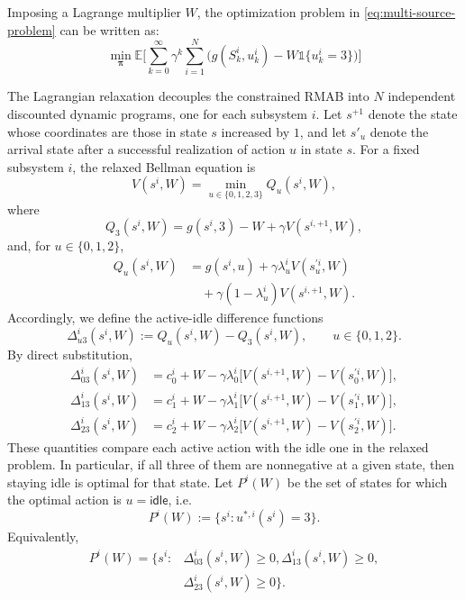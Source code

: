 \documentclass[letterpaper,journal]{IEEEtran}
\begin{document}
Imposing a Lagrange multiplier $W$, the optimization problem in \eqref{eq:multi-source-problem} can be written as:
\begin{equation}\label{eq:relaxed-problem}
\min_{\boldsymbol{\pi}}\mathbb{E}\Biggl[
\sum_{k=0}^{\infty}\gamma^k\sum_{i=1}^N
\bigl(g(S^i_k,u^i_k)-W\mathds{1}\{u^i_k=3\}\bigr)
\Biggr]
\end{equation}

The Lagrangian relaxation decouples the constrained RMAB into $N$ independent discounted dynamic programs, one for each subsystem $i$. Let $s^{+1}$ denote the state whose coordinates are those in state $s$ increased by $1$, and let $s'_u$ denote the arrival state after a successful realization of action $u$ in state $s$. For a fixed subsystem $i$, the relaxed Bellman equation is
\[
V(s^i,W)=\min_{u\in\{0,1,2,3\}}Q_u(s^i,W),
\]
where
\[
Q_3(s^i,W)=g(s^i,3)-W+\gamma V(s^{i,+1},W),
\]
and, for $u\in\{0,1,2\}$,
\[
\begin{aligned}
Q_u(s^i,W)&=g(s^i,u)+\gamma\lambda^i_uV(s^{\prime i}_u,W)\\
&\quad+\gamma(1-\lambda^i_u)V(s^{i,+1},W).
\end{aligned}
\]
Accordingly, we define the active-idle difference functions
\begin{equation}
\Delta^i_{u3}(s^i,W):=Q_u(s^i,W)-Q_3(s^i,W),\qquad u\in\{0,1,2\}.
\end{equation}
By direct substitution,
\begin{subequations}\label{eq:deltas-relaxed}
\begin{align}
\Delta^i_{03}(s^i,W)&=c^i_0+W-\gamma\lambda^i_0\bigl[V(s^{i,+1},W)-V(s^{\prime i}_0,W)\bigr],\\
\Delta^i_{13}(s^i,W)&=c^i_1+W-\gamma\lambda^i_1\bigl[V(s^{i,+1},W)-V(s^{\prime i}_1,W)\bigr],\\
\Delta^i_{23}(s^i,W)&=c^i_2+W-\gamma\lambda^i_2\bigl[V(s^{i,+1},W)-V(s^{\prime i}_2,W)\bigr].
\end{align}
\end{subequations}
These quantities compare each active action with the idle one in the relaxed problem. In particular, if all three of them are nonnegative at a given state, then staying idle is optimal for that state. Let $P^i(W)$ be the set of states for which the optimal action is $u=\mathsf{idle}$, i.e.
\[
P^i(W):=\{s^i:u^{*,i}(s^i)=3\}.
\]
Equivalently,
\[
\begin{aligned}
P^i(W)=\{s^i:&\Delta^i_{03}(s^i,W)\geq 0,
\Delta^i_{13}(s^i,W)\geq 0,\\
&\Delta^i_{23}(s^i,W)\geq 0\}.
\end{aligned}
\]
\end{document}

